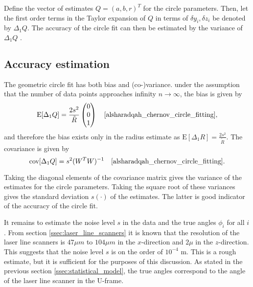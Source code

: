 Define the vector of estimates $Q = (a, b, r)^T$ for the circle parameters. Then, let the first order terms in the Taylor expansion of $Q$ in terms of $\delta y_i, \delta z_i$ be denoted by $\Delta_1Q$. The accuracy of the circle fit can then be estimated by the variance of $\Delta_1Q$ \cite[section 2]{alsharadqah_chernov_circle_fitting}.

\subsection{Accuracy estimation}
The geometric circle fit has both bias and (co-)variance. under the assumption that the number of data points approaches infinity $n \rightarrow \infty$, the bias is given by
\begin{equation}
    \text{E}[\Delta_1 Q] = \frac{2s^2}{\tilde{R}} \begin{pmatrix} 0 \\ 0 \\ 1 \end{pmatrix} \quad \text{\cite[equation 6.14]{alsharadqah_chernov_circle_fitting}},
    \label{eq:circle_fit_bias}
\end{equation}
and therefore the bias exists only in the radius estimate as $\text{E}[\Delta_1 R] =\frac{2s^2}{\tilde{R}}$. The covariance is given by
\begin{equation}
    \text{cov}[\Delta_1 Q] = s^2 (W^T W)^{-1} \quad \text{\cite[equation 8.12]{alsharadqah_chernov_circle_fitting}}.
    \label{eq:circle_fit_variance}
\end{equation}

Taking the diagonal elements of the covariance matrix gives the variance of the estimates for the circle parameters. Taking the square root of these variances gives the standard deviation $s(\cdot)$ of the estimates. The latter is good indicator of the accuracy of the circle fit.

It remains to estimate the noise level $s$ in the data and the true angles $\phi_i$ for all $i$. From section \ref{ssec:laser_line_scanners} it is known that the resolution of the laser line scanners is $47 \mu m$ to $104 \mu m$ in the $x$-direction and $2 \mu$ in the $z$-direction. This suggests that the noise level $s$ is on the order of $10^{-4}$ m. This is a rough estimate, but it is sufficient for the purposes of this discussion. As stated in the previous section \ref{ssec:statistical_model}, the true angles correspond to the angle of the laser line scanner in the U-frame.

